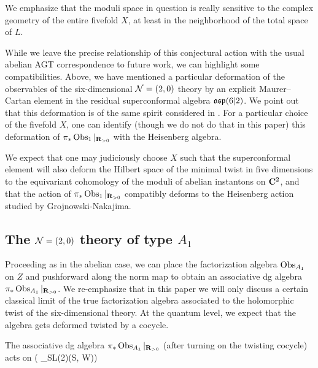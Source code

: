 We emphasize that the moduli space in question is really sensitive to the complex geometry of the entire fivefold $X$, at least in the neighborhood of the total space of $L$.

While we leave the precise relationship of this conjectural action with the usual abelian AGT correspondence to future work, we can highlight some compatibilities. Above, we have mentioned a particular deformation of the observables of the six-dimensional $\mathcal N = (2,0)$ theory by an explicit Maurer--Cartan element in the residual superconformal algebra $\mathfrak{osp}(6|2)$. We point out that this deformation is of the same spirit considered in \cite{BeemEtAl}. For a particular choice of the fivefold $X$, one can identify (though we do not do that in this paper) this deformation of $\pi_{*} \operatorname{Obs}_1|_{\mathbf{R}_{>0}}$ with the Heisenberg algebra.

We expect that one may judiciously choose $X$ such that the superconformal element will also deform the Hilbert space of the minimal twist in five dimensions to the equivariant cohomology of the moduli of abelian instantons on $\mathbf{C}^{2}$, and that the action of $\pi_{*}\operatorname{Obs}_{1}|_{\mathbf{R}_{>0}}$ compatibly deforms to the Heisenberg action studied by Grojnowski-Nakajima.

\subsection*{The $\mathcal N=(2,0)$ theory of type $A_1$} 


Proceeding as in the abelian case, we can place the factorization algebra $\operatorname{Obs}_{A_1}$ on $Z$ and pushforward along the norm map to obtain an associative dg algebra $\pi_{*} \operatorname{Obs}_{A_1}|_{\mathbf{R}_{>0}}$. We re-emphasize that in this paper we will only discuss a certain classical limit of the true factorization algebra associated to the holomorphic twist of the six-dimensional theory. At the quantum level, we expect that the algebra gets deformed twisted by a cocycle.

\begin{conj}
  The associative dg algebra $\pi_{*} \operatorname{Obs}_{A_1}|_{\mathbf{R}_{>0}}$ (after turning on the twisting cocycle) acts on
  \beqn
  \cO \left (  _{SL(2)}(S, W)\right)
  \eeqn
\end{conj}

